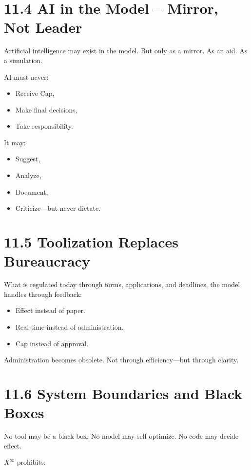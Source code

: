 \documentclass[12pt,a4paper]{book}
\begin{document}
\section*{11.4 AI in the Model – Mirror, Not Leader}

Artificial intelligence may exist in the model.  
But only as a mirror. As an aid. As a simulation.

AI must never:

\begin{itemize}
    \item Receive Cap,
    \item Make final decisions,
    \item Take responsibility.
\end{itemize}

It may:

\begin{itemize}
    \item Suggest,
    \item Analyze,
    \item Document,
    \item Criticize—but never dictate.
\end{itemize}

\section*{11.5 Toolization Replaces Bureaucracy}

What is regulated today through forms, applications, and deadlines,  
the model handles through feedback:

\begin{itemize}
    \item Effect instead of paper.
    \item Real-time instead of administration.
    \item Cap instead of approval.
\end{itemize}

Administration becomes obsolete.  
Not through efficiency—but through clarity.

\section*{11.6 System Boundaries and Black Boxes}

No tool may be a black box.  
No model may self-optimize.  
No code may decide effect.

$X^\infty$ prohibits:
\end{document}
